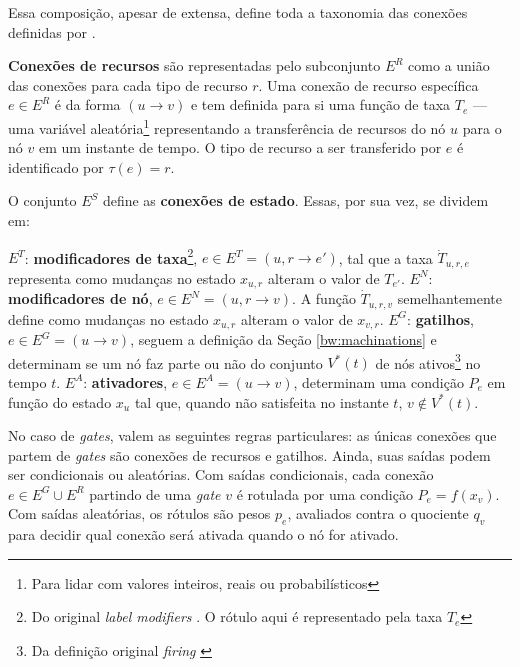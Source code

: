 \documentclass[10pt,a4paper]{article}
\newcommand{\note}[1]{
    \vspace{0.3cm}
    \colorbox{blue!30}{
            \begin{minipage}{0.4\textwidth}
		    \ttfamily \footnotesize
               #1
            \end{minipage}
        }
    \vspace{0.3cm}
}
\begin{document}
Essa composição, apesar de extensa, define toda a taxonomia das conexões definidas por \citeauthor{machinations}.

\textbf{Conexões de recursos} são representadas pelo subconjunto $E^R$ como a união das conexões para cada tipo de recurso $r$. Uma conexão de recurso específica $e \in E^R$ é da forma $(u \rightarrow v)$ e tem definida para si uma função de taxa $T_e$ --- uma variável aleatória\footnote{Para lidar com valores inteiros, reais ou probabilísticos} representando a transferência de recursos do nó $u$ para o nó $v$ em um instante de tempo. O tipo de recurso a ser transferido por $e$ é identificado por $\tau (e) = r$.

O conjunto $E^S$ define as \textbf{conexões de estado}. Essas, por sua vez, se dividem em:

\begin{outline}
    \1 $E^T$: \textbf{modificadores de taxa}\footnote{Do original \textit{label modifiers} \parencite{machinations}. O rótulo aqui é representado pela taxa $T_e$}, $e \in E^T = (u, r\rightarrow e')$, tal que a taxa $\dot{T}_{u,r,e}$ representa como mudanças no estado $x_{u, r}$ alteram o valor de $T_{e'}$.
    \1 $E^N$: \textbf{modificadores de nó}, $e \in E^N = (u, r \rightarrow v)$. A função $\dot{T}_{u,r,v}$ semelhantemente define como mudanças no estado $x_{u, r}$ alteram o valor de $x_{v, r}$.
    \1 $E^G$: \textbf{gatilhos}, $e \in E^G = (u \rightarrow v)$, seguem a definição da Seção \ref{bw:machinations} e determinam se um nó faz parte ou não do conjunto $V^*(t)$ de nós ativos\footnote{Da definição original \textit{firing} \parencite{machinations}} no tempo $t$. 
    \1 $E^A$: \textbf{ativadores}, $e \in E^A = (u \rightarrow v)$, determinam uma condição $P_e$ em função do estado $x_{u}$ tal que, quando não satisfeita no instante $t$, $v \notin V^*(t)$.
\end{outline}

No caso de \textit{gates}, valem as seguintes regras particulares: as únicas conexões que partem de \textit{gates} são conexões de recursos e gatilhos. Ainda, suas saídas podem ser condicionais ou aleatórias. Com saídas condicionais, cada conexão $e \in E^G \cup E^R$ partindo de uma \textit{gate} $v$ é rotulada por uma condição $P_e = f(x_v)$. Com saídas aleatórias, os rótulos são pesos $p_e$, avaliados contra o quociente $q_v$ para decidir qual conexão será ativada quando o nó for ativado.
\end{document}
